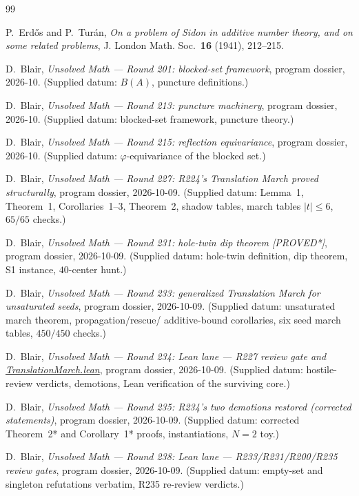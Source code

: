 \documentclass[11pt,a4paper]{article}
\theoremstyle{definition}
\begin{document}
\begin{thebibliography}{99}

P.~Erd\H{o}s and P.~Tur\'an,
\emph{On a problem of Sidon in additive number theory, and on some
related problems},
J. London Math. Soc.\ \textbf{16} (1941), 212--215.

D.~Blair,
\emph{Unsolved Math --- Round 201: blocked-set framework},
program dossier, 2026-10.
(Supplied datum: $B(A)$, puncture definitions.)

D.~Blair,
\emph{Unsolved Math --- Round 213: puncture machinery},
program dossier, 2026-10.
(Supplied datum: blocked-set framework, puncture theory.)

D.~Blair,
\emph{Unsolved Math --- Round 215: reflection equivariance},
program dossier, 2026-10.
(Supplied datum: $\varphi$-equivariance of the blocked set.)

D.~Blair,
\emph{Unsolved Math --- Round 227: R224's Translation March proved
structurally},
program dossier, 2026-10-09.
(Supplied datum: Lemma~1, Theorem~1, Corollaries~1--3, Theorem~2,
shadow tables, march tables $|t|\le6$, $65/65$ checks.)

D.~Blair,
\emph{Unsolved Math --- Round 231: hole-twin dip theorem [PROVED*]},
program dossier, 2026-10-09.
(Supplied datum: hole-twin definition, dip theorem, S1 instance,
$40$-center hunt.)

D.~Blair,
\emph{Unsolved Math --- Round 233: generalized Translation March for
unsaturated seeds},
program dossier, 2026-10-09.
(Supplied datum: unsaturated march theorem, propagation/rescue/
additive-bound corollaries, six seed march tables, $450/450$ checks.)

D.~Blair,
\emph{Unsolved Math --- Round 234: Lean lane --- R227 review gate and
\url{TranslationMarch.lean}},
program dossier, 2026-10-09.
(Supplied datum: hostile-review verdicts, demotions, Lean
verification of the surviving core.)

D.~Blair,
\emph{Unsolved Math --- Round 235: R234's two demotions restored
(corrected statements)},
program dossier, 2026-10-09.
(Supplied datum: corrected Theorem~2* and Corollary~1* proofs,
instantiations, $N=2$ toy.)

D.~Blair,
\emph{Unsolved Math --- Round 238: Lean lane --- R233/R231/R200/R235
review gates},
program dossier, 2026-10-09.
(Supplied datum: empty-set and singleton refutations verbatim,
R235 re-review verdicts.)


\end{thebibliography}
\end{document}
